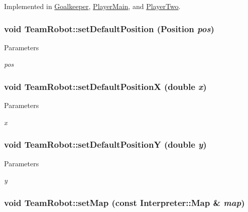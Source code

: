 Implemented in \hyperlink{classGoalkeeper_acfa6fbad0f6b1627fd59cc7cce6ff321}{Goalkeeper}, \hyperlink{classPlayerMain_a5c4af159392663660f91809052422945}{PlayerMain}, and \hyperlink{classPlayerTwo_aa0294cf24297f66ffd92f1a250794340}{PlayerTwo}.

\hypertarget{classTeamRobot_a322f046e260aedff6f2c8edc5730c9ac}{
\subsubsection[{setDefaultPosition}]{\setlength{\rightskip}{0pt plus 5cm}void TeamRobot::setDefaultPosition (Position {\em pos})}}
\label{classTeamRobot_a322f046e260aedff6f2c8edc5730c9ac}

\begin{DoxyParams}{Parameters}
\item[{\em pos}]\end{DoxyParams}
\hypertarget{classTeamRobot_a527cefdb32f2bc0a4fa770207d4dc934}{
\subsubsection[{setDefaultPositionX}]{\setlength{\rightskip}{0pt plus 5cm}void TeamRobot::setDefaultPositionX (double {\em x})}}
\label{classTeamRobot_a527cefdb32f2bc0a4fa770207d4dc934}

\begin{DoxyParams}{Parameters}
\item[{\em x}]\end{DoxyParams}
\hypertarget{classTeamRobot_afeb86cb88b18030049d525d1d6790e6e}{
\subsubsection[{setDefaultPositionY}]{\setlength{\rightskip}{0pt plus 5cm}void TeamRobot::setDefaultPositionY (double {\em y})}}
\label{classTeamRobot_afeb86cb88b18030049d525d1d6790e6e}

\begin{DoxyParams}{Parameters}
\item[{\em y}]\end{DoxyParams}
\hypertarget{classTeamRobot_ab8c92b6228aed8eef31d0b1b0fce8690}{
\subsubsection[{setMap}]{\setlength{\rightskip}{0pt plus 5cm}void TeamRobot::setMap (const {\bf Interpreter::Map} \& {\em map})}}
\label{classTeamRobot_ab8c92b6228aed8eef31d0b1b0fce8690}

